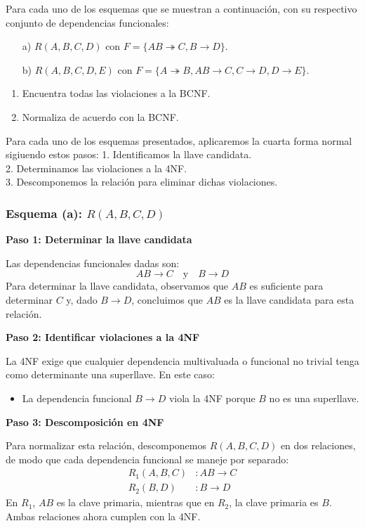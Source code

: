 Para cada uno de los esquemas que se muestran a continuación, con su respectivo conjunto de dependencias funcionales:

\begin{itemize}
	\item[a)] \( R(A, B, C, D) \) con \( F = \{AB \twoheadrightarrow C, B \to D\} \).
	\item[b)] \( R(A, B, C, D, E) \) con \( F = \{A \twoheadrightarrow B, AB \to C, C \to D, D \to E\} \).
\end{itemize}

\begin{enumerate}
	\item Encuentra todas las violaciones a la BCNF.
	\item Normaliza de acuerdo con la BCNF.
\end{enumerate}

Para cada uno de los esquemas presentados, aplicaremos la cuarta forma normal sigiuendo estos pasos:
1. Identificamos la llave candidata.\\
2. Determinamos las violaciones a la 4NF.\\
3. Descomponemos la relación para eliminar dichas violaciones.

\subsubsection*{Esquema (a): \( R(A, B, C, D) \)}

\textbf{Paso 1: Determinar la llave candidata}

Las dependencias funcionales dadas son:
\[
AB \rightarrow C \quad \text{y} \quad B \rightarrow D
\]
Para determinar la llave candidata, observamos que \( AB \) es suficiente para determinar \( C \) y, dado \( B \rightarrow D \), concluimos que \( AB \) es la llave candidata para esta relación.

\textbf{Paso 2: Identificar violaciones a la 4NF}

La 4NF exige que cualquier dependencia multivaluada o funcional no trivial tenga como determinante una superllave. En este caso:
\begin{itemize}
	\item La dependencia funcional \( B \rightarrow D \) viola la 4NF porque \( B \) no es una superllave.
\end{itemize}

\textbf{Paso 3: Descomposición en 4NF}

Para normalizar esta relación, descomponemos \( R(A, B, C, D) \) en dos relaciones, de modo que cada dependencia funcional se maneje por separado:
\begin{align*}
	R_1(A, B, C) & : AB \rightarrow C \\
	R_2(B, D) & : B \rightarrow D
\end{align*}
En \( R_1 \), \( AB \) es la clave primaria, mientras que en \( R_2 \), la clave primaria es \( B \). Ambas relaciones ahora cumplen con la 4NF.

